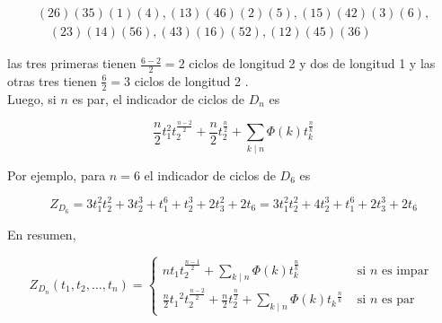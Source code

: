 \documentclass[10pt]{article}
\begin{document}
$$
\begin{gathered}
(26)(35)(1)(4),(13)(46)(2)(5),(15)(42)(3)(6), \\
\quad(23)(14)(56),(43)(16)(52),(12)(45)(36)
\end{gathered}
$$

las tres primeras tienen $\frac{6-2}{2}=2$ ciclos de longitud 2 y dos de longitud 1 y las otras tres tienen $\frac{6}{2}=3$ ciclos de longitud 2 .\\
Luego, si $n$ es par, el indicador de ciclos de $D_{n}$ es

$$
\frac{n}{2} t_{1}^{2} t_{2}^{\frac{n-2}{2}}+\frac{n}{2} t_{2}^{\frac{n}{2}}+\sum_{k \mid n} \Phi(k) t_{k}^{\frac{n}{k}}
$$

Por ejemplo, para $n=6$ el indicador de ciclos de $D_{6}$ es

$$
Z_{D_{6}}=3 t_{1}^{2} t_{2}^{2}+3 t_{2}^{3}+t_{1}^{6}+t_{2}^{3}+2 t_{3}^{2}+2 t_{6}=3 t_{1}^{2} t_{2}^{2}+4 t_{2}^{3}+t_{1}^{6}+2 t_{3}^{3}+2 t_{6}
$$

En resumen,

$$
Z_{D_{n}}\left(t_{1}, t_{2}, \ldots, t_{n}\right)= \begin{cases}n t_{1} t_{2}^{\frac{n-1}{2}}+\sum_{k \mid n} \Phi(k) t_{k}^{\frac{n}{k}} & \text { si } n \text { es impar } \\ \frac{n}{2} t_{1}{ }^{2} t_{2}^{\frac{n-2}{2}}+\frac{n}{2} t_{2}^{\frac{n}{2}}+\sum_{k \mid n} \Phi(k) t_{k}{ }^{\frac{n}{k}} & \text { si } n \text { es par }\end{cases}
$$
\end{document}
